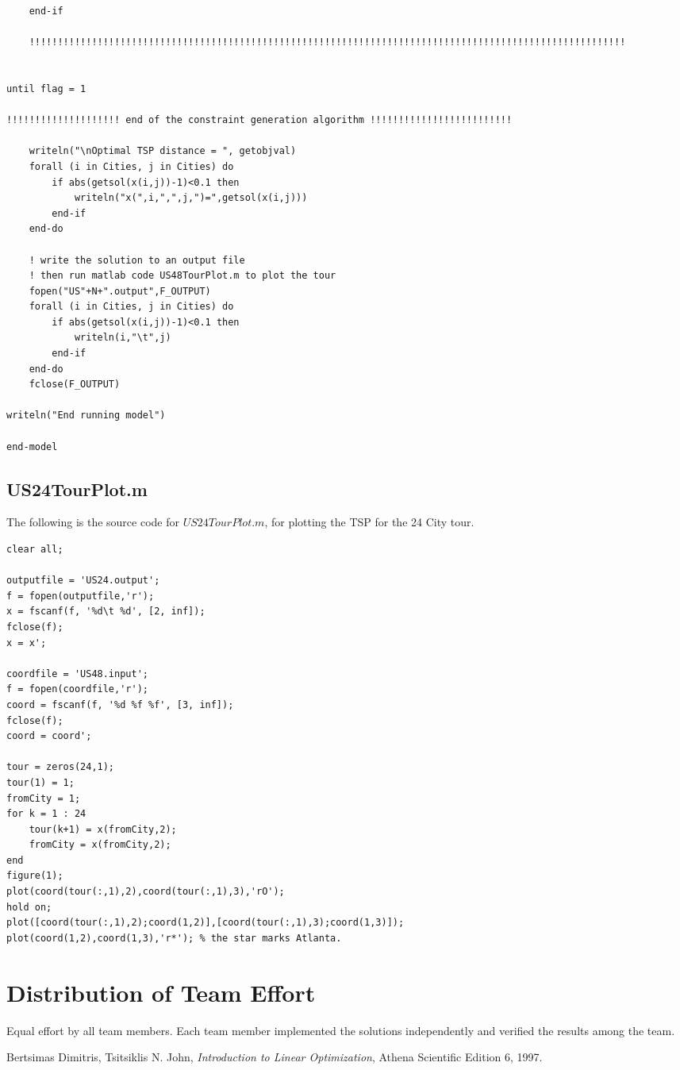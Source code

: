 \documentclass[twoside,12pt]{article}
\begin{document}
\begin{verbatim}
	end-if

    !!!!!!!!!!!!!!!!!!!!!!!!!!!!!!!!!!!!!!!!!!!!!!!!!!!!!!!!!!!!!!!!!!!!!!!!!!!!!!!!!!!!!!!!!!!!!!!!!!!!!!!!!
  
    
until flag = 1

!!!!!!!!!!!!!!!!!!!! end of the constraint generation algorithm !!!!!!!!!!!!!!!!!!!!!!!!!

	writeln("\nOptimal TSP distance = ", getobjval)
	forall (i in Cities, j in Cities) do
		if abs(getsol(x(i,j))-1)<0.1 then
			writeln("x(",i,",",j,")=",getsol(x(i,j)))
		end-if
	end-do
	
	! write the solution to an output file 
	! then run matlab code US48TourPlot.m to plot the tour
	fopen("US"+N+".output",F_OUTPUT)
	forall (i in Cities, j in Cities) do
		if abs(getsol(x(i,j))-1)<0.1 then
			writeln(i,"\t",j)
		end-if
	end-do
	fclose(F_OUTPUT)

writeln("End running model")

end-model
\end{verbatim}


\subsection{US24TourPlot.m}

The following is the source code for $US24TourPlot.m$, for plotting the TSP for the 24 City tour.

\begin{verbatim}
clear all;

outputfile = 'US24.output';
f = fopen(outputfile,'r');
x = fscanf(f, '%d\t %d', [2, inf]);
fclose(f);
x = x';

coordfile = 'US48.input';
f = fopen(coordfile,'r');
coord = fscanf(f, '%d %f %f', [3, inf]);
fclose(f);
coord = coord';

tour = zeros(24,1);
tour(1) = 1;
fromCity = 1;
for k = 1 : 24
    tour(k+1) = x(fromCity,2);
    fromCity = x(fromCity,2);
end
figure(1);
plot(coord(tour(:,1),2),coord(tour(:,1),3),'rO');
hold on;
plot([coord(tour(:,1),2);coord(1,2)],[coord(tour(:,1),3);coord(1,3)]);
plot(coord(1,2),coord(1,3),'r*'); % the star marks Atlanta.
\end{verbatim}



\section{Distribution of Team Effort}
Equal effort by all team members. Each team member implemented the solutions independently and verified the results among the team.





\begin{thebibliography}{9}

  Bertsimas Dimitris, Tsitsiklis N. John,
  \emph{Introduction to Linear Optimization},
  Athena Scientific Edition 6,
  1997.

\end{thebibliography}
\end{document}
